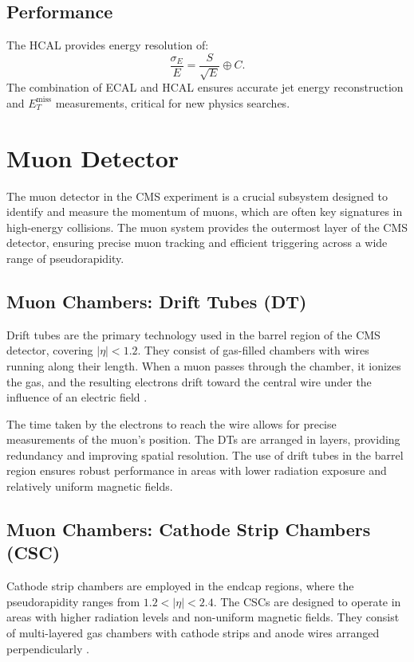 \subsection{Performance}
The HCAL provides energy resolution of:\cite{cms_tdr_hcal}
\[
\frac{\sigma_E}{E} = \frac{S}{\sqrt{E}} \oplus C.
\]
The combination of ECAL and HCAL ensures accurate jet energy reconstruction and $E_T^{\text{miss}}$ measurements, critical for new physics searches.

\section{Muon Detector}
The muon detector in the CMS experiment is a crucial subsystem designed to identify and measure the momentum of muons, which are often key signatures in high-energy collisions. The muon system provides the outermost layer of the CMS detector, ensuring precise muon tracking and efficient triggering across a wide range of pseudorapidity.

\subsection{Muon Chambers: Drift Tubes (DT)}
Drift tubes are the primary technology used in the barrel region of the CMS detector, covering $|\eta| < 1.2$. They consist of gas-filled chambers with wires running along their length. When a muon passes through the chamber, it ionizes the gas, and the resulting electrons drift toward the central wire under the influence of an electric field \cite{muon_tdr}.

The time taken by the electrons to reach the wire allows for precise measurements of the muon's position. The DTs are arranged in layers, providing redundancy and improving spatial resolution. The use of drift tubes in the barrel region ensures robust performance in areas with lower radiation exposure and relatively uniform magnetic fields.

\subsection{Muon Chambers: Cathode Strip Chambers (CSC)}
Cathode strip chambers are employed in the endcap regions, where the pseudorapidity ranges from $1.2 < |\eta| < 2.4$. The CSCs are designed to operate in areas with higher radiation levels and non-uniform magnetic fields. They consist of multi-layered gas chambers with cathode strips and anode wires arranged perpendicularly \cite{muon_tdr}.

